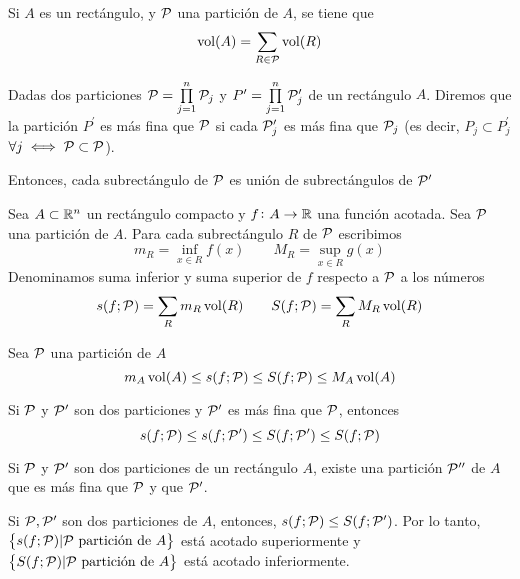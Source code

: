 \begin{lema}
	Si $A$ es un rectángulo, y $\mathcal{P}$ una partición de $A$, se tiene que
	\[
		\operatorname{vol}(A) = \sum_{R \in \mathcal{P}} \operatorname{vol}(R)
	\]
\end{lema}

\begin{defi}
	Dadas dos particiones $\mathcal{P} = \prod\limits^n_{j=1} \mathcal{P}_j$ y
	$P^\prime = \prod\limits^n_{j=1} \mathcal{P}^\prime_j$ de un rectángulo $A$. Diremos
	que la partición $P^\prime$ es más fina que $\mathcal{P}$ si cada $\mathcal{P}^\prime_j$ es más
	fina que $\mathcal{P}_j$ (es decir, $P_j \subset P^\prime_j$ $\forall j \iff \mathcal{P}
	\subset \mathcal{P}$).

	Entonces, cada subrectángulo de $\mathcal{P}$ es unión de subrectángulos de
	$\mathcal{P}^\prime$
\end{defi}

\begin{defi}
	Sea $A \subset \mathbb{R}^n$ un rectángulo compacto y $f \colon A \to \mathbb{R}$ una
	función acotada. Sea $\mathcal{P}$ una partición de $A$. Para cada subrectángulo $R$
	de $\mathcal{P}$ escribimos
	\[
		m_R = \inf_{x \in R} f(x) \qquad M_R = \sup_{x \in R} g(x)
	\]
	Denominamos suma inferior y suma superior de $f$ respecto a $\mathcal{P}$ a los números
	\[
		s(f;\mathcal{P}) = \sum_R m_R\operatorname{vol}(R) \qquad S(f;\mathcal{P}) = \sum_R M_R\operatorname{vol}(R)
	\]
\end{defi}

\begin{obs}
	Sea $\mathcal{P}$ una partición de $A$
	\[
		m_A\operatorname{vol}(A) \leq s(f;\mathcal{P}) \leq S(f;\mathcal{P}) \leq M_A\operatorname{vol}(A)
	\]
\end{obs}
\begin{obs}
	Si $\mathcal{P}$ y $\mathcal{P}^\prime$ son dos particiones y $\mathcal{P}^\prime$ es más fina que
	$\mathcal{P}$, entonces
	\[
		s(f;\mathcal{P}) \leq s(f;\mathcal{P}^\prime) \leq S(f;\mathcal{P}^\prime) \leq S(f;\mathcal{P})
	\]
\end{obs}

\begin{lema}
	Si $\mathcal{P}$ y $\mathcal{P}^\prime$ son dos particiones de un rectángulo $A$, existe una
	partición $\mathcal{P}^{\prime\prime}$ de $A$ que es más fina que $\mathcal{P}$ y que
	$\mathcal{P}^\prime$.
\end{lema}

\begin{col}
	Si $\mathcal{P}, \mathcal{P}^\prime$ son dos particiones de $A$, entonces,
	$s(f;\mathcal{P}) \leq S(f;\mathcal{P}^\prime)$. Por lo tanto,
	$\left\{s(f;\mathcal{P}) \vert \mathcal{P} \text{ partición de } A\right\}$ está acotado superiormente
	y $\left\{S(f;\mathcal{P}) \vert\mathcal{P}\text{ partición de } A\right\}$ está acotado inferiormente.
\end{col}

